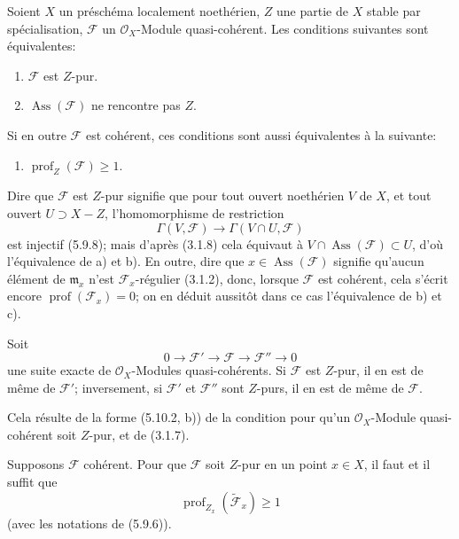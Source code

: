 \begin{proposition}[5.10.2]
\label{IV.2.s5.10.2-fr}
Soient $X$ un préschéma localement noethérien, $Z$ une partie de $X$ stable
par spécialisation, $\mathcal F$ un $\mathcal O_X$-Module quasi-cohérent.
Les conditions suivantes sont équivalentes:
\begin{enumerate}
\item[a)] $\mathcal F$ est $Z$-pur.
\item[b)] $\operatorname{Ass}(\mathcal F)$ ne rencontre pas $Z$.
\end{enumerate}
Si en outre $\mathcal F$ est cohérent, ces conditions sont aussi équivalentes
à la suivante:
\begin{enumerate}
\item[c)] $\operatorname{prof}_Z(\mathcal F)\geq1$.
\end{enumerate}
\end{proposition}

Dire que $\mathcal F$ est $Z$-pur signifie que pour tout ouvert noethérien
$V$ de $X$, et tout ouvert $U\supset X-Z$, l'homomorphisme de restriction
\[
\Gamma(V,\mathcal F)\longrightarrow\Gamma(V\cap U,\mathcal F)
\]
est injectif (5.9.8); mais d'après (3.1.8) cela équivaut à
$V\cap\operatorname{Ass}(\mathcal F)\subset U$, d'où l'équivalence de a) et
b). En outre, dire que $x\in\operatorname{Ass}(\mathcal F)$ signifie
qu'aucun élément de $\mathfrak m_x$ n'est $\mathcal F_x$-régulier (3.1.2),
donc, lorsque $\mathcal F$ est cohérent, cela s'écrit encore
$\operatorname{prof}(\mathcal F_x)=0$; on en déduit aussitôt dans ce cas
l'équivalence de b) et c).

\begin{corollary}[5.10.3]
\label{IV.2.s5.10.3-fr}
Soit
\[
0\longrightarrow\mathcal F'\longrightarrow\mathcal F
\longrightarrow\mathcal F''\longrightarrow0
\]
une suite exacte de $\mathcal O_X$-Modules quasi-cohérents. Si $\mathcal F$
est $Z$-pur, il en est de même de $\mathcal F'$; inversement, si
$\mathcal F'$ et $\mathcal F''$ sont $Z$-purs, il en est de même de
$\mathcal F$.
\end{corollary}


Cela résulte de la forme (5.10.2, b)) de la condition pour qu'un
$\mathcal O_X$-Module quasi-cohérent soit $Z$-pur, et de (3.1.7).

\begin{corollary}[5.10.4]
\label{IV.2.s5.10.4-fr}
Supposons $\mathcal F$ cohérent. Pour que $\mathcal F$ soit $Z$-pur en un
point $x\in X$, il faut et il suffit que
\[
\operatorname{prof}_{Z_x}(\widetilde{\mathcal F}_x)\geq1
\]
(avec les notations de (5.9.6)).
\end{corollary}

